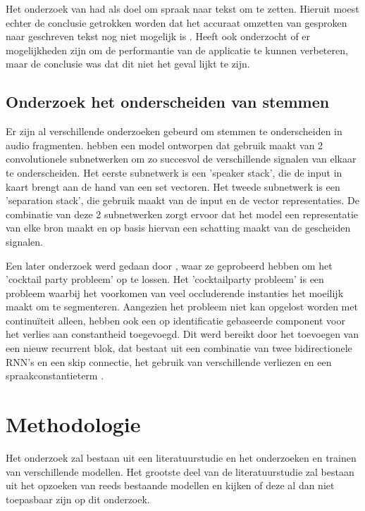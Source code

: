 Het onderzoek van \textcite{Schryver2024} had als doel om spraak naar tekst om te zetten. Hieruit moest echter de conclusie getrokken worden dat het accuraat omzetten van gesproken naar geschreven tekst nog niet mogelijk is \autocite{Schryver2024}. \textcite{Schryver2024} Heeft ook onderzocht of er mogelijkheden zijn om de performantie van de applicatie te kunnen verbeteren, maar de conclusie was dat dit niet het geval lijkt te zijn.

\subsection{Onderzoek het onderscheiden van stemmen}

Er zijn al verschillende onderzoeken gebeurd om stemmen te onderscheiden in audio fragmenten. \textcite{Zeghidour2021} hebben een model ontworpen dat gebruik maakt van 2 convolutionele subnetwerken om zo succesvol de verschillende signalen van elkaar te onderscheiden. Het eerste subnetwerk is een 'speaker stack', die de input in kaart brengt aan de hand van een set vectoren. Het tweede subnetwerk is een 'separation stack', die gebruik maakt van de input en de vector representaties. De combinatie van deze 2 subnetwerken zorgt ervoor dat het model een representatie van elke bron maakt en op basis hiervan een schatting maakt van de gescheiden signalen. \autocite{Zeghidour2021}

Een later onderzoek werd gedaan door \textcite{Nachmani2020}, waar ze geprobeerd hebben om het 'cocktail party probleem' op te lossen. Het 'cocktailparty probleem' is een probleem waarbij het voorkomen van veel occluderende instanties het moeilijk maakt om te segmenteren. Aangezien het probleem niet kan opgelost worden met continuïteit alleen, hebben \textcite{Nachmani2020} ook een op identificatie gebaseerde component voor het verlies aan constantheid toegevoegd. Dit werd bereikt door het toevoegen van een nieuw recurrent blok, dat bestaat uit een combinatie van twee bidirectionele RNN's en een skip connectie, het gebruik van verschillende verliezen en een spraakconstantieterm \autocite{Nachmani2020}.

\section{Methodologie}%
\label{sec:methodologie}

Het onderzoek zal bestaan uit een literatuurstudie en het onderzoeken en trainen van verschillende modellen. Het grootste deel van de literatuurstudie zal bestaan uit het opzoeken van reeds bestaande modellen en kijken of deze al dan niet toepasbaar zijn op dit onderzoek.

